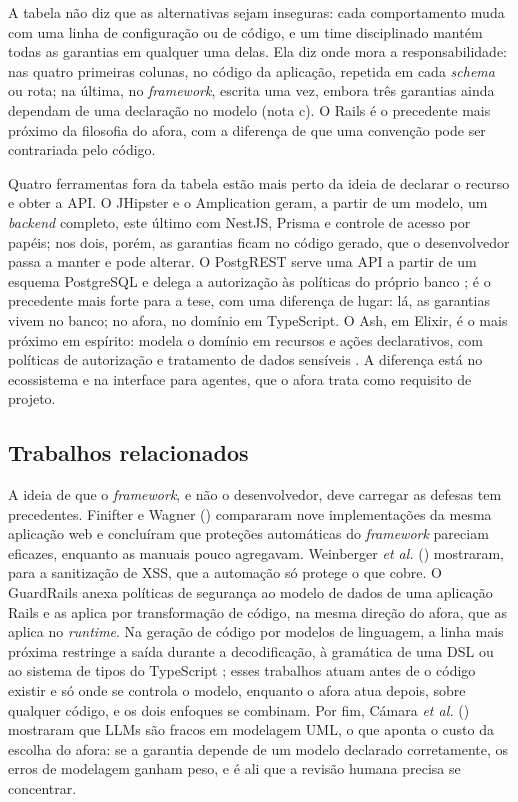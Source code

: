 \documentclass[a4paper,12pt]{article}
\providecommand{\NoCaseChange}[1]{#1} %
\DeclareRobustCommand{\etal}{\NoCaseChange{\textit{et al.}}}
\newcommand{\estr}[1]{\textit{#1}}
\begin{document}
A tabela não diz que as alternativas sejam inseguras: cada comportamento muda com uma linha de configuração ou de código, e um time disciplinado mantém todas as garantias em qualquer uma delas. Ela diz onde mora a responsabilidade: nas quatro primeiras colunas, no código da aplicação, repetida em cada \estr{schema} ou rota; na última, no \estr{framework}, escrita uma vez, embora três garantias ainda dependam de uma declaração no modelo (nota c). O Rails é o precedente mais próximo da filosofia do afora, com a diferença de que uma convenção pode ser contrariada pelo código.

Quatro ferramentas fora da tabela estão mais perto da ideia de declarar o recurso e obter a API. O JHipster \citep{jhipster2026} e o Amplication \citep{amplication2026} geram, a partir de um modelo, um \estr{backend} completo, este último com NestJS, Prisma e controle de acesso por papéis; nos dois, porém, as garantias ficam no código gerado, que o desenvolvedor passa a manter e pode alterar. O PostgREST serve uma API a partir de um esquema PostgreSQL e delega a autorização às políticas do próprio banco \citep{postgrest2026}; é o precedente mais forte para a tese, com uma diferença de lugar: lá, as garantias vivem no banco; no afora, no domínio em TypeScript. O Ash, em Elixir, é o mais próximo em espírito: modela o domínio em recursos e ações declarativos, com políticas de autorização e tratamento de dados sensíveis \citep{ash2026}. A diferença está no ecossistema e na interface para agentes, que o afora trata como requisito de projeto.

\subsection{Trabalhos relacionados}\label{sec:relacionados}

A ideia de que o \estr{framework}, e não o desenvolvedor, deve carregar as defesas tem precedentes. Finifter e Wagner (\citeyear{finifter2011}) compararam nove implementações da mesma aplicação web e concluíram que proteções automáticas do \estr{framework} pareciam eficazes, enquanto as manuais pouco agregavam. Weinberger \etal{} (\citeyear{weinberger2011}) mostraram, para a sanitização de XSS, que a automação só protege o que cobre. O GuardRails \citep{burket2011} anexa políticas de segurança ao modelo de dados de uma aplicação Rails e as aplica por transformação de código, na mesma direção do afora, que as aplica no \estr{runtime}. Na geração de código por modelos de linguagem, a linha mais próxima restringe a saída durante a decodificação, à gramática de uma DSL \citep{poesia2022} ou ao sistema de tipos do TypeScript \citep{mundler2025}; esses trabalhos atuam antes de o código existir e só onde se controla o modelo, enquanto o afora atua depois, sobre qualquer código, e os dois enfoques se combinam. Por fim, Cámara \etal{} (\citeyear{camara2023}) mostraram que LLMs são fracos em modelagem UML, o que aponta o custo da escolha do afora: se a garantia depende de um modelo declarado corretamente, os erros de modelagem ganham peso, e é ali que a revisão humana precisa se concentrar.
\end{document}
